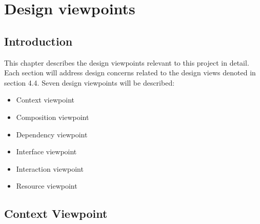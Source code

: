 \section{Design viewpoints}

\subsection{Introduction}
    This chapter describes the design viewpoints relevant to this project in detail. Each section will address design concerns related to the design views denoted in section 4.4. Seven design viewpoints will be described:
    \begin{itemize}
        \item Context viewpoint
        \item Composition viewpoint
        \item Dependency viewpoint
        \item Interface viewpoint
        \item Interaction viewpoint
        \item Resource viewpoint
    \end{itemize}

\subsection{Context Viewpoint}
    
        
          
